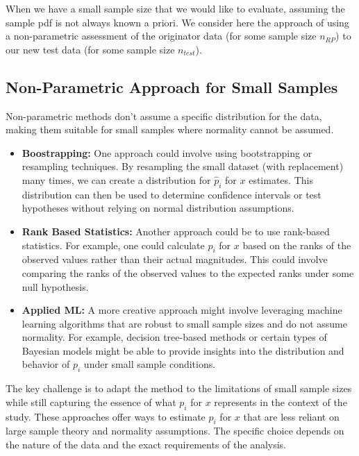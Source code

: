 \documentclass[
  12pt,
  a4paper,
]{article}
\numberwithin{equation}{section}
\theoremstyle{plain}
\theoremstyle{definition}
\theoremstyle{remark}
\theoremstyle{note}
\begin{document}
When we have a small sample size that we would like to evaluate,
assuming the sample pdf is not always known a priori. We consider here
the approach of using a non-parametric assessment of the originator data
(for some sample size \(n_{RP}\)) to our new test data (for some sample
size \(n_{test}\)).

\hypertarget{non-parametric-approach-for-small-samples}{%
\subsection{Non-Parametric Approach for Small
Samples}\label{non-parametric-approach-for-small-samples}}

Non-parametric methods don't assume a specific distribution for the
data, making them suitable for small samples where normality cannot be
assumed.

\begin{itemize}
\item
  \textbf{Boostrapping:} One approach could involve using bootstrapping
  or resampling techniques. By resampling the small dataset (with
  replacement) many times, we can create a distribution for
  \(\hat{p}_i\) for \(x\) estimates. This distribution can then be used
  to determine confidence intervals or test hypotheses without relying
  on normal distribution assumptions.
\item
  \textbf{Rank Based Statistics:} Another approach could be to use
  rank-based statistics. For example, one could calculate \(p_i\) for
  \(x\) based on the ranks of the observed values rather than their
  actual magnitudes. This could involve comparing the ranks of the
  observed values to the expected ranks under some null hypothesis.
\item
  \textbf{Applied ML:} A more creative approach might involve leveraging
  machine learning algorithms that are robust to small sample sizes and
  do not assume normality. For example, decision tree-based methods or
  certain types of Bayesian models might be able to provide insights
  into the distribution and behavior of \(p_i\) under small sample
  conditions.
\end{itemize}

The key challenge is to adapt the method to the limitations of small
sample sizes while still capturing the essence of what \(p_i\) for \(x\)
represents in the context of the study. These approaches offer ways to
estimate \(p_i\) for \(x\) that are less reliant on large sample theory
and normality assumptions. The specific choice depends on the nature of
the data and the exact requirements of the analysis.
\end{document}
